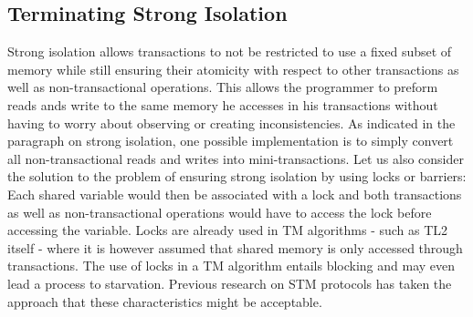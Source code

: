




\subsection{Terminating Strong  Isolation}
\label{sec:protocol}


Strong isolation allows transactions to not be restricted to use a fixed
subset of memory while still ensuring their atomicity with respect to
other transactions as well as non-transactional operations.
This allows the programmer to preform reads ands write to the same memory he accesses
in his transactions without having to worry about observing or creating inconsistencies.
As indicated in the paragraph on strong isolation, one possible implementation
is to simply convert all non-transactional reads and writes into mini-transactions.
Let us also consider the solution to  the problem of  ensuring strong isolation 
by using  locks or barriers: Each shared
variable would then  
be associated with a lock and both transactions as well as non-transactional 
operations would have to access the lock before accessing the variable.
Locks are already used  in TM algorithms - such as TL2  itself - where it is
however     assumed   that  shared   memory   is   only  accessed   through
transactions. The use  of locks  in a TM algorithm  entails blocking and may
even lead a process to starvation.
Previous research on STM protocols has taken the approach that
these characteristics might be acceptable.

